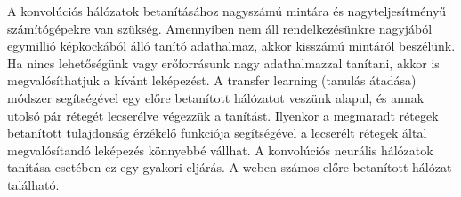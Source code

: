 A konvolúciós hálózatok betanításához nagyszámú mintára és nagyteljesítményű számítógépekre van szükség. Amennyiben nem áll rendelkezésünkre nagyjából egymillió képkockából álló tanító adathalmaz, akkor kisszámú mintáról beszélünk. Ha nincs lehetőségünk vagy erőforrásunk nagy adathalmazzal tanítani, akkor is megvalósíthatjuk a kívánt leképezést. A transfer learning (tanulás átadása) módszer segítségével egy előre betanított hálózatot veszünk alapul, és annak utolsó pár rétegét lecserélve végezzük a tanítást. Ilyenkor a megmaradt rétegek betanított tulajdonság érzékelő funkciója segítségével a lecserélt rétegek által megvalósítandó leképezés könnyebbé vállhat. A konvolúciós neurális hálózatok tanítása esetében ez egy gyakori eljárás. A weben számos előre betanított hálózat található.

